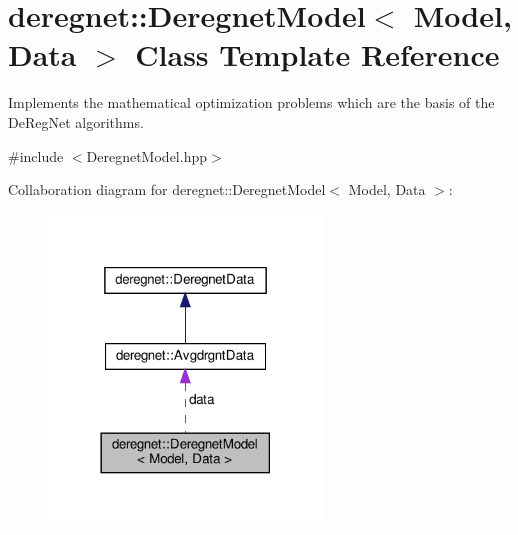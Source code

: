 \hypertarget{classderegnet_1_1DeregnetModel}{}\section{deregnet\+:\+:Deregnet\+Model$<$ Model, Data $>$ Class Template Reference}
\label{classderegnet_1_1DeregnetModel}


Implements the mathematical optimization problems which are the basis of the De\+Reg\+Net algorithms.  




{\ttfamily \#include $<$Deregnet\+Model.\+hpp$>$}



Collaboration diagram for deregnet\+:\+:Deregnet\+Model$<$ Model, Data $>$\+:\nopagebreak
\begin{figure}[H]
\begin{center}
\leavevmode
\includegraphics[width=206pt]{classderegnet_1_1DeregnetModel__coll__graph}
\end{center}
\end{figure}
